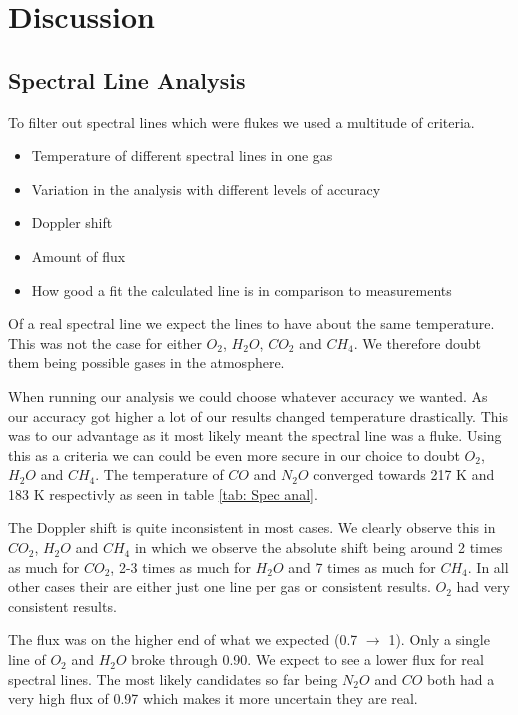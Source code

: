 \documentclass[reprint,english,notitlepage]{revtex4-2}
\begin{document}
\section{Discussion} \label{sec: discussion}
\subsection{Spectral Line Analysis} \label{ssec: Spec Anal}
  
To filter out spectral lines which were flukes we used a multitude of criteria.

\begin{itemize}
  \item Temperature of different spectral lines in one gas
  \item Variation in the analysis with different levels of accuracy
  \item Doppler shift
  \item Amount of flux
  \item How good a fit the calculated line is in comparison to measurements
\end{itemize}

Of a real spectral line we expect the lines to have about the same temperature. This was not the case for either $ O_{2} $, $ H_2O  $, $ CO_2 $ and $ CH_4 $. We therefore doubt them being possible gases in the atmosphere.
\newline

When running our analysis we could choose whatever accuracy we wanted. As our accuracy got higher a lot of our results changed temperature drastically. This was to our advantage as it most likely meant the spectral line was a fluke. Using this as a criteria we can could be even more secure in our choice to doubt $ O_2 $, $ H_2O $ and $ CH_4 $. The temperature of $ CO $ and $ N_2O $  converged towards 217 K and 183 K respectivly as seen in table \ref{tab: Spec anal}.
\newline

The Doppler shift is quite inconsistent in most cases. We clearly observe this in $ CO_2 $, $ H_2O $ and $ CH_4 $ in which we observe the absolute shift being around 2 times as much for $ CO_2 $, 2-3 times as much for $ H_2O $ and 7 times as much for $ CH_4 $. In all other cases their are either just one line per gas or consistent results. $ O_2 $ had very consistent results. 
\newline

The flux was on the higher end of what we expected (0.7 $ →  $ 1). Only a single line of $ O_2 $ and $ H_2O $ broke through 0.90. We expect to see a lower flux for real spectral lines. The most likely candidates so far being $ N_2O $ and $ CO  $ both had a very high flux of 0.97 which makes it more uncertain they are real. 
\newline
\end{document}
